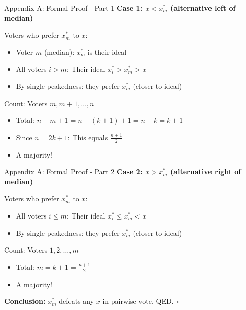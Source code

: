 \documentclass[10pt]{beamer}
\begin{document}
\begin{frame}{Appendix A: Formal Proof - Part 1}
\textbf{Case 1: $x < x_m^*$ (alternative left of median)}


Voters who prefer $x_m^*$ to $x$:
\begin{itemize}
\item Voter $m$ (median): $x_m^*$ is their ideal
\item All voters $i > m$: Their ideal $x_i^* > x_m^* > x$
\item By single-peakedness: they prefer $x_m^*$ (closer to ideal)
\end{itemize}


Count: Voters $m, m+1, \ldots, n$
\begin{itemize}
\item Total: $n - m + 1 = n - (k+1) + 1 = n - k = k + 1$
\item Since $n = 2k+1$: This equals $\frac{n+1}{2}$
\item \alert{A majority!}
\end{itemize}
\end{frame}

\begin{frame}{Appendix A: Formal Proof - Part 2}
\textbf{Case 2: $x > x_m^*$ (alternative right of median)}


Voters who prefer $x_m^*$ to $x$:
\begin{itemize}
\item All voters $i \leq m$: Their ideal $x_i^* \leq x_m^* < x$
\item By single-peakedness: they prefer $x_m^*$ (closer to ideal)
\end{itemize}


Count: Voters $1, 2, \ldots, m$
\begin{itemize}
\item Total: $m = k+1 = \frac{n+1}{2}$
\item \alert{A majority!}
\end{itemize}


\textbf{Conclusion:} $x_m^*$ defeats any $x$ in pairwise vote. QED. $\square$


\small{\hyperlink{visual-proof}{}}
\end{frame}
\end{document}
